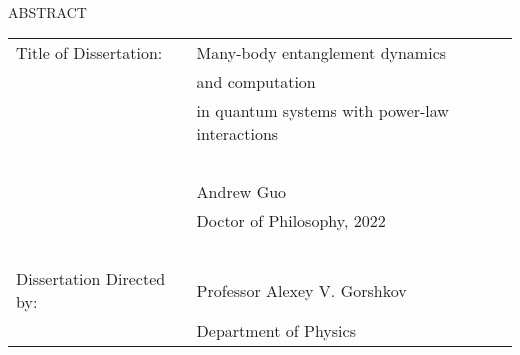 \hbox{\ }

\begin{center}
\large{{ABSTRACT}}

\vspace{3em}

\end{center}
\hspace{-.15in}
\begin{tabular}{ll}
Title of Dissertation:     & {\large  Many-body entanglement dynamics }\\
                           & {\large  and computation } \\
                           & {\large  in quantum systems with power-law interactions } \\
\                         \\
                           & {\large  Andrew Guo } \\
                           & {\large Doctor of Philosophy, 2022} \\
\                         \\
Dissertation Directed by:  & {\large  Professor Alexey V. Gorshkov} \\
                           & {\large  Department of Physics } \\
\end{tabular}

\vspace{3em}

\begin{doublespacing}
\par
\end{doublespacing}
